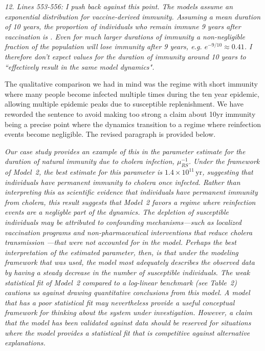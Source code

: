 \documentclass[11pt]{article}
\newcommand\muRS{\mu_{RS}}
\newcommand\report[1]{{\color{mygreen} \vspace{1mm}\hspace{0.25in}\parbox{6in}{\em #1}}}
\newcommand\article[1]{{\color{blue} \vspace{1mm}\hspace{0.25in}\parbox{6in}{\em #1}}}
\begin{document}
\report{12.
  Lines 553-556: I push back against this point. The models assume an exponential distribution for vaccine-derived immunity. Assuming a mean duration of 10 years, the proportion of individuals who remain immune 9 years after vaccination is . Even for much larger durations of immunity a non-negligible fraction of the population will lose immunity after 9 years, e.g. $e^{-9/10}\approx 0.41$. I therefore don't expect values for the duration of immunity around 10 years to ``effectively result in the same model dynamics".
}

The qualitative comparison we had in mind was the regime with short immunity where many people become infected multiple times during the ten year epidemic, allowing multiple epidemic peaks due to susceptible replenishment.
We have reworded the sentence to avoid making too strong a claim about 10yr immunity being a precise point where the dynamics transition to a regime where reinfection events become negligible.
The revised paragraph is provided below.

\article{Our case study provides an example of this in the parameter estimate for the duration of natural immunity due to cholera infection, $\muRS^{-1}$.
Under the framework of Model~2, the best estimate for this parameter is $1.4 \times 10^{11} \, \mathrm{yr}$, suggesting that individuals have permanent immunity to cholera once infected.
Rather than interpreting this as scientific evidence that individuals have permanent immunity from cholera, this result suggests that Model~2 favors a regime where reinfection events are a negligble part of the dynamics.
The depletion of susceptible individuals may be attributed to confounding mechanisms---such as localized vaccination programs and non-pharmaceutical interventions that reduce cholera transmission \cite{trevisin22, rebaudet21}---that were not accounted for in the model.
Perhaps the best interpretation of the estimated parameter, then, is that under the modeling framework that was used, the model most adequately describes the observed data by having a steady decrease in the number of susceptible individuals.
The weak statistical fit of Model~2 compared to a log-linear benchmark (see Table~2) cautions us against drawing quantitative conclusions from this model.
A model that has a poor statistical fit may nevertheless provide a useful conceptual framework for thinking about the system under investigation.
However, a claim that the model has been validated against data should be reserved for situations where the model provides a statistical fit that is competitive against alternative explanations.}
\end{document}
